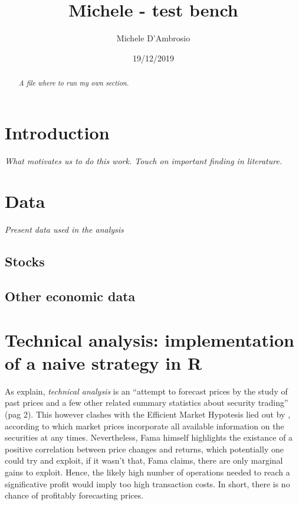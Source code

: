 \documentclass[
  11pt,
]{article}
\title{Michele - test bench}
\author{Michele D'Ambrosio}
\date{19/12/2019}
\begin{document}
\maketitle
\begin{abstract}
\emph{A file where to run my own section.}
\end{abstract}

{
\setcounter{tocdepth}{3}
\tableofcontents
}
\newpage

\hypertarget{introduction}{%
\section{Introduction}\label{introduction}}

\emph{What motivates us to do this work. Touch on important finding in
literature. }

\hypertarget{data}{%
\section{Data}\label{data}}

\emph{Present data used in the analysis}

\hypertarget{stocks}{%
\subsection{Stocks}\label{stocks}}

\hypertarget{other-economic-data}{%
\subsection{Other economic data}\label{other-economic-data}}

\newpage

\hypertarget{technical-analysis-implementation-of-a-naive-strategy-in-r}{%
\section{Technical analysis: implementation of a naive strategy in
R}\label{technical-analysis-implementation-of-a-naive-strategy-in-r}}

As \citet{Brock1992} explain, \emph{technical analysis} is an ``attempt
to forecast prices by the study of past prices and a few other related
summary statistics about security trading'' (pag 2). This however
clashes with the Efficient Market Hypotesis lied out by \citet{Fama1970}
, according to which market prices incorporate all available information
on the securities at any times. Nevertheless, Fama himself highlights
the existance of a positive correlation between price changes and
returns, which potentially one could try and exploit, if it wasn't that,
Fama claims, there are only marginal gains to exploit. Hence, the likely
high number of operations needed to reach a significative profit would
imply too high transaction costs. In short, there is no chance of
profitably forecasting prices.
\end{document}
